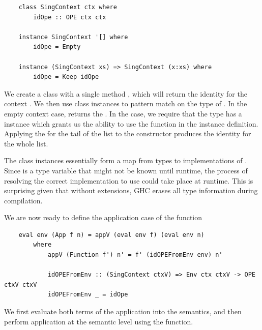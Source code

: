 \begin{lstlisting}
    class SingContext ctx where
        idOpe :: OPE ctx ctx

    instance SingContext '[] where
        idOpe = Empty

    instance (SingContext xs) => SingContext (x:xs) where
        idOpe = Keep idOpe
\end{lstlisting}

We create a class  with a single method , which will return the identity  for the context . We then use class instances to pattern match on the type of . In the empty context case,  returns the  . In the  case, we require that the type  has a  instance which grants us the ability to use the  function in the instance definition. Applying the  for the tail of the list to the  constructor produces the identity  for the whole list. 

The class instances essentially form a map from types to implementations of . Since  is a type variable that might not be known until runtime, the process of resolving the correct implementation to use could take place at runtime. This is surprising given that without extensions, GHC erases all type information during compilation. 




We are now ready to define the application case of the  function

\begin{lstlisting}
    eval env (App f n) = appV (eval env f) (eval env n) 
        where
            appV (Function f') n' = f' (idOPEFromEnv env) n'

            idOPEFromEnv :: (SingContext ctxV) => Env ctx ctxV -> OPE ctxV ctxV
            idOPEFromEnv _ = idOpe 
\end{lstlisting}

We first evaluate both terms of the application into the semantics, and then perform application at the semantic level using the  function. 

